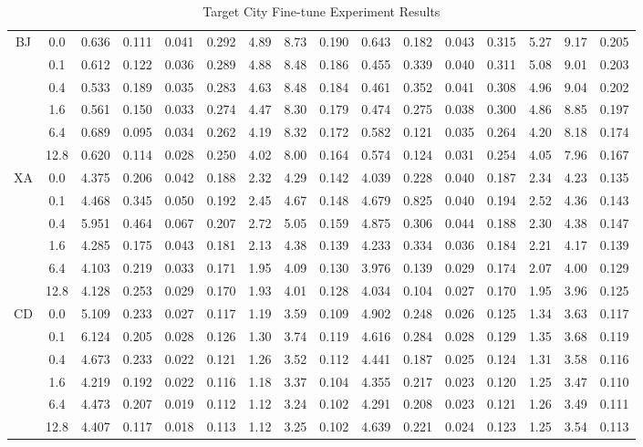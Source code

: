 \begin{table*}[t]
{\begin{tabular}{c|c|ccccccc|ccccccc}
    \multirow{6}{*}{BJ} & 0.0 & 0.636 & 0.111 & 0.041 & 0.292 & 4.89 & 8.73 & 0.190 & 0.643 & 0.182 & 0.043 & 0.315 & 5.27 & 9.17 & 0.205 \\ 
        & 0.1 & 0.612 & 0.122 & 0.036 & 0.289 & 4.88 & 8.48 & 0.186 & 0.455 & 0.339 & 0.040 & 0.311 & 5.08 & 9.01 & 0.203 \\ 
        & 0.4 & 0.533 & 0.189 & 0.035 & 0.283 & 4.63 & 8.48 & 0.184 & 0.461 & 0.352 & 0.041 & 0.308 & 4.96 & 9.04 & 0.202 \\ 
        & 1.6 & 0.561 & 0.150 & 0.033 & 0.274 & 4.47 & 8.30 & 0.179 & 0.474 & 0.275 & 0.038 & 0.300 & 4.86 & 8.85 & 0.197 \\ 
        & 6.4 & 0.689 & 0.095 & 0.034 & 0.262 & 4.19 & 8.32 & 0.172 & 0.582 & 0.121 & 0.035 & 0.264 & 4.20 & 8.18 & 0.174 \\ 
        & 12.8 & 0.620 & 0.114 & 0.028 & 0.250 & 4.02 & 8.00 & 0.164 & 0.574 & 0.124 & 0.031 & 0.254 & 4.05 & 7.96 & 0.167 \\ 
    \midrule
    \multirow{6}{*}{XA} & 0.0 & 4.375 & 0.206 & 0.042 & 0.188 & 2.32 & 4.29 & 0.142 & 4.039 & 0.228 & 0.040 & 0.187 & 2.34 & 4.23 & 0.135 \\ 
        & 0.1 & 4.468 & 0.345 & 0.050 & 0.192 & 2.45 & 4.67 & 0.148 & 4.679 & 0.825 & 0.040 & 0.194 & 2.52 & 4.36 & 0.143 \\ 
        & 0.4 & 5.951 & 0.464 & 0.067 & 0.207 & 2.72 & 5.05 & 0.159 & 4.875 & 0.306 & 0.044 & 0.188 & 2.30 & 4.38 & 0.147 \\ 
        & 1.6 & 4.285 & 0.175 & 0.043 & 0.181 & 2.13 & 4.38 & 0.139 & 4.233 & 0.334 & 0.036 & 0.184 & 2.21 & 4.17 & 0.139 \\ 
        & 6.4 & 4.103 & 0.219 & 0.033 & 0.171 & 1.95 & 4.09 & 0.130 & 3.976 & 0.139 & 0.029 & 0.174 & 2.07 & 4.00 & 0.129 \\ 
        & 12.8 & 4.128 & 0.253 & 0.029 & 0.170 & 1.93 & 4.01 & 0.128 & 4.034 & 0.104 & 0.027 & 0.170 & 1.95 & 3.96 & 0.125 \\ 
    \midrule
    \multirow{6}{*}{CD} & 0.0 & 5.109 & 0.233 & 0.027 & 0.117 & 1.19 & 3.59 & 0.109 & 4.902 & 0.248 & 0.026 & 0.125 & 1.34 & 3.63 & 0.117 \\ 
        & 0.1 & 6.124 & 0.205 & 0.028 & 0.126 & 1.30 & 3.74 & 0.119 & 4.616 & 0.284 & 0.028 & 0.129 & 1.35 & 3.68 & 0.119 \\ 
        & 0.4 & 4.673 & 0.233 & 0.022 & 0.121 & 1.26 & 3.52 & 0.112 & 4.441 & 0.187 & 0.025 & 0.124 & 1.31 & 3.58 & 0.116 \\ 
        & 1.6 & 4.219 & 0.192 & 0.022 & 0.116 & 1.18 & 3.37 & 0.104 & 4.355 & 0.217 & 0.023 & 0.120 & 1.25 & 3.47 & 0.110 \\ 
        & 6.4 & 4.473 & 0.207 & 0.019 & 0.112 & 1.12 & 3.24 & 0.102 & 4.291 & 0.208 & 0.023 & 0.121 & 1.26 & 3.49 & 0.111 \\ 
        & 12.8 & 4.407 & 0.117 & 0.018 & 0.113 & 1.12 & 3.25 & 0.102 & 4.639 & 0.221 & 0.024 & 0.123 & 1.25 & 3.54 & 0.113 \\ 
      \bottomrule
      \end{tabular}%
    }
    \caption{Target City Fine-tune Experiment Results}
    \label{tab:finetune_total}%
\end{table*}%

